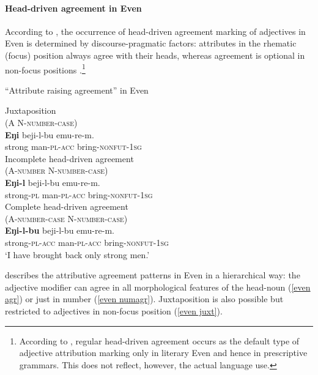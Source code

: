 \paragraph*{Head\hyp{}driven agreement in Even}
According to \citet[20]{malchukov1995}, the occurrence of head\hyp{}driven agreement marking of adjectives in Even is determined by discourse-pragmatic factors: attributes in the rhematic (focus) position always agree with their heads, whereas agreement is optional in non-focus positions \cite[31–32]{malchukov1995}.\footnote{According to \cite[31]{malchukov1995}, regular head\hyp{}driven agreement occurs as the default type of adjective attribution marking only in literary Even and hence in prescriptive grammars. This does not reflect, however, the actual language use.}
\begin{exe}
\ex
\label{even raising}
\rm{“Attribute raising agreement” in Even \citep[30–31]{malchukov1995}}
\begin{xlist}
\ex
\label{even juxt}
\rm{Juxtaposition}\\
\rm{(A N-\textsc{number}-\textsc{case})}\\
\gll	\textbf{Eŋi} beji-l-bu emu-re-m.\\
	strong man-\textsc{pl}-\textsc{acc} bring-\textsc{nonfut}-\textsc{1sg}\\

\ex
\label{even numagr}	
\rm{Incomplete head\hyp{}driven agreement}\\
\rm{(A-\textsc{number} N-\textsc{number}-\textsc{case})}\\
\gll	\textbf{Eŋi-l} beji-l-bu emu-re-m.\\
	strong-\textsc{pl} man-\textsc{pl}-\textsc{acc} bring-\textsc{nonfut}-\textsc{1sg}\\

\ex
\label{even agr}	
\rm{Complete head\hyp{}driven agreement}\\
\rm{(A-\textsc{number}-\textsc{case} N-\textsc{number}-\textsc{case})}\\
\gll	\textbf{Eŋi-l-bu} beji-l-bu emu-re-m.\\
	strong-\textsc{pl}-\textsc{acc} man-\textsc{pl}-\textsc{acc} bring-\textsc{nonfut}-\textsc{1sg}\\
\glt	‘I have brought back only strong men.’
\end{xlist}
\end{exe}
\citet[30–31]{malchukov1995} describes the attributive agreement patterns in Even in a hierarchical way: the adjective modifier can agree in all morphological features of the head-noun (\ref{even agr}) or just in number (\ref{even numagr}). Juxtaposition is also possible but restricted to adjectives in non-focus position (\ref{even juxt}).

